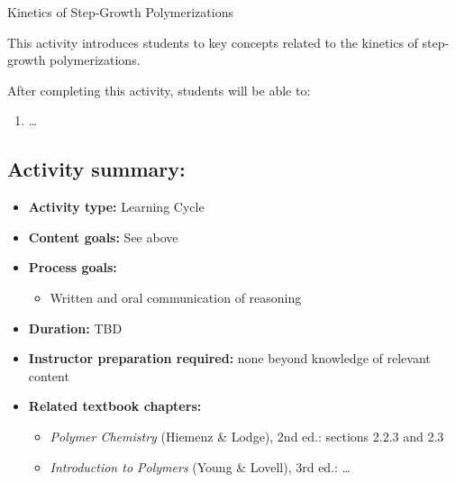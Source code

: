 %
%
%
%

\renewcommand{\figpath}{content/polymchem/stepgrowth/kinetics/figs}
\renewcommand{\labelbase}{step-kinetics}

\begin{activity}{Kinetics of Step-Growth Polymerizations}

\begin{instructornotes}

	This activity introduces students to key concepts related to the kinetics of step-growth polymerizations.
	
	After completing this activity, students will be able to:
			\begin{enumerate}
				\item \dots
			\end{enumerate}
	
			
	\subsection*{Activity summary:}
	\begin{itemize}
		\item \textbf{Activity type:} Learning Cycle
		\item \textbf{Content goals:} See above
		\item \textbf{Process goals:} %
			\begin{itemize}
				\item Written and oral communication of reasoning
			\end{itemize}
		\item \textbf{Duration:} TBD %
		\item \textbf{Instructor preparation required:} none beyond knowledge of relevant content
		\item \textbf{Related textbook chapters:}
			\begin{itemize}
				\item \emph{Polymer Chemistry} (Hiemenz \& Lodge), 2nd ed.: sections 2.2.3 and 2.3
				\item \emph{Introduction to Polymers} (Young \& Lovell), 3rd ed.: \dots 
			\end{itemize}
	\end{itemize}


\end{instructornotes}
\end{activity}
